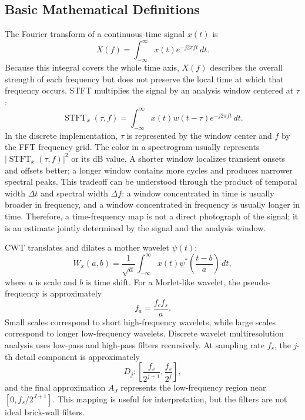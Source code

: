 \documentclass[a4paper,11pt]{article}
\numberwithin{equation}{section}
\begin{document}
\subsection{Basic Mathematical Definitions}
The Fourier transform of a continuous-time signal $x(t)$ is
\begin{equation}
X(f)=\int_{-\infty}^{\infty}x(t)e^{-j2\pi ft}\,dt .
\end{equation}
Because this integral covers the whole time axis, $X(f)$ describes the overall strength of each frequency but does not preserve the local time at which that frequency occurs. STFT multiplies the signal by an analysis window centered at $\tau$:
\begin{equation}
\operatorname{STFT}_x(\tau,f)=\int_{-\infty}^{\infty}x(t)w(t-\tau)e^{-j2\pi ft}\,dt .
\end{equation}
In the discrete implementation, $\tau$ is represented by the window center and $f$ by the FFT frequency grid. The color in a spectrogram usually represents $|\operatorname{STFT}_x(\tau,f)|^2$ or its dB value. A shorter window localizes transient onsets and offsets better; a longer window contains more cycles and produces narrower spectral peaks. This tradeoff can be understood through the product of temporal width $\Delta t$ and spectral width $\Delta f$: a window concentrated in time is usually broader in frequency, and a window concentrated in frequency is usually longer in time. Therefore, a time-frequency map is not a direct photograph of the signal; it is an estimate jointly determined by the signal and the analysis window.

CWT translates and dilates a mother wavelet $\psi(t)$:
\begin{equation}
W_x(a,b)=\frac{1}{\sqrt{a}}\int_{-\infty}^{\infty}x(t)\psi^\ast\left(\frac{t-b}{a}\right)\,dt ,
\end{equation}
where $a$ is scale and $b$ is time shift. For a Morlet-like wavelet, the pseudo-frequency is approximately
\begin{equation}
f_a=\frac{f_c f_s}{a} .
\end{equation}
Small scales correspond to short high-frequency wavelets, while large scales correspond to longer low-frequency wavelets. Discrete wavelet multiresolution analysis uses low-pass and high-pass filters recursively. At sampling rate $f_s$, the $j$-th detail component is approximately
\begin{equation}
D_j:\left[\frac{f_s}{2^{j+1}},\frac{f_s}{2^j}\right],
\end{equation}
and the final approximation $A_J$ represents the low-frequency region near $[0,f_s/2^{J+1}]$. This mapping is useful for interpretation, but the filters are not ideal brick-wall filters.
\end{document}
